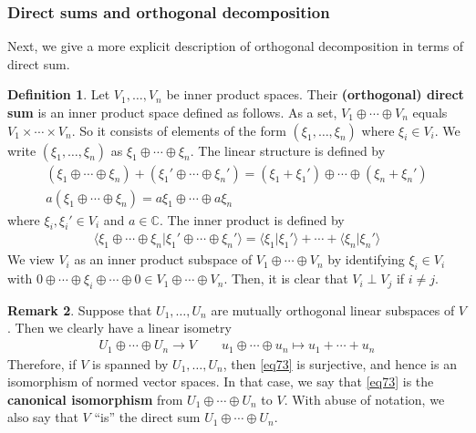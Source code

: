 \documentclass[12pt,b5paper,notitlepage]{article}
\theoremstyle{definition}
\newtheorem{df}{Definition}[subsection]
\newtheorem{rem}[df]{Remark}
\theoremstyle{plain}
\newcommand{\bk}[1]{\langle {#1}\rangle}
\newcommand{\Cbb}{\mathbb C}
\numberwithin{equation}{section}
\begin{document}
\subsubsection{Direct sums and orthogonal decomposition}

Next, we give a more explicit description of orthogonal decomposition in terms of direct sum.


\begin{df}
Let $V_1,\dots,V_n$ be inner product spaces. Their \textbf{(orthogonal) direct sum}   is an inner product space defined as follows. As a set, $V_1\oplus\cdots\oplus V_n$ equals $V_1\times\cdots\times V_n$. So it consists of elements of the form $(\xi_1,\dots,\xi_n)$ where $\xi_i\in V_i$. We write $(\xi_1,\dots,\xi_n)$ as $\xi_1\oplus\cdots\oplus \xi_n$. The linear structure is defined by
\begin{gather*}
(\xi_1\oplus\cdots\oplus \xi_n)+(\xi_1'\oplus\cdots\oplus \xi_n')=(\xi_1+\xi_1')\oplus\cdots\oplus (\xi_n+\xi_n')\\
a(\xi_1\oplus\cdots\oplus \xi_n)=a\xi_1\oplus\cdots\oplus a\xi_n
\end{gather*}
where $\xi_i,\xi_i'\in V_i$ and $a\in\Cbb$. The inner product is defined by
\begin{align*}
\bk{\xi_1\oplus\cdots\oplus \xi_n|\xi_1'\oplus\cdots\oplus \xi_n'}=\bk{\xi_1|\xi_1'}+\cdots+\bk{\xi_n|\xi_n'}
\end{align*}
We view $V_i$ as an inner product subspace of $V_1\oplus\cdots\oplus V_n$ by identifying $\xi_i\in V_i$ with $0\oplus\cdots\oplus \xi_i\oplus\cdots\oplus 0\in V_1\oplus\cdots\oplus V_n$. Then, it is clear that $V_i\perp V_j$ if $i\neq j$.
\end{df}

\begin{rem}
Suppose that $U_1,\dots,U_n$ are mutually orthogonal linear subspaces of $V$. Then we clearly have a linear isometry
\begin{gather}\label{eq73}
U_1\oplus\cdots\oplus U_n\longrightarrow V\qquad u_1\oplus\cdots\oplus u_n\mapsto u_1+\cdots+u_n
\end{gather}
Therefore, if $V$ is spanned by $U_1,\dots,U_n$, then \eqref{eq73} is surjective, and hence is an isomorphism of normed vector spaces. In that case, we say that \eqref{eq73} is the \textbf{canonical isomorphism} from $U_1\oplus\cdots\oplus U_n$ to $V$. With abuse of notation, we also say that $V$ ``is'' the direct sum $U_1\oplus\cdots\oplus U_n$. 
\end{rem}
\end{document}

